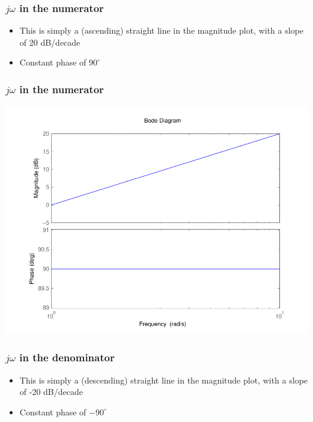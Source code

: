 \begin{frame}
\frametitle{$j\omega$ in the numerator}

\begin{itemize}
\item This is simply a (ascending) straight line in the magnitude plot, with a slope of 20 dB/decade
\item Constant phase of $90^{\circ}$
\end{itemize}



\end{frame}

\begin{frame}
\frametitle{$j\omega$ in the numerator}

\includegraphics[scale=0.5]{BodeZeroNum}

\end{frame}

\begin{frame}
\frametitle{$j\omega$ in the denominator}

\begin{itemize}
\item This is simply a (descending) straight line in the magnitude plot, with a slope of -20 dB/decade
\item Constant phase of $-90^{\circ}$
\end{itemize}

\end{frame}

